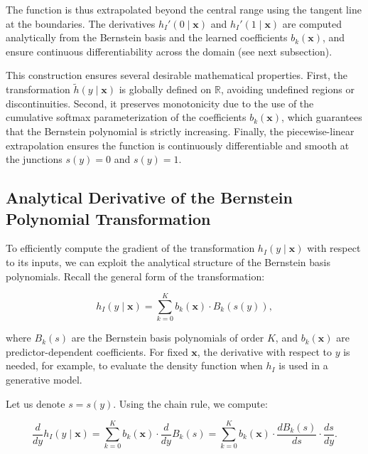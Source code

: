 The function is thus extrapolated beyond the central range using the tangent line at the boundaries. The derivatives \( h_I'(0 \mid \mathbf{x}) \) and \( h_I'(1 \mid \mathbf{x}) \) are computed analytically from the Bernstein basis and the learned coefficients \( b_k(\mathbf{x}) \), and ensure continuous differentiability across the domain (see next subsection).


This construction ensures several desirable mathematical properties. First, the transformation \( \tilde{h}(y \mid \mathbf{x}) \) is globally defined on \( \mathbb{R} \), avoiding undefined regions or discontinuities. Second, it preserves monotonicity due to the use of the cumulative softmax parameterization of the coefficients \( b_k(\mathbf{x}) \), which guarantees that the Bernstein polynomial is strictly increasing. Finally, the piecewise-linear extrapolation ensures the function is continuously differentiable and smooth at the junctions \( s(y) = 0 \) and \( s(y) = 1 \).




\subsection{Analytical Derivative of the Bernstein Polynomial Transformation}

To efficiently compute the gradient of the transformation \( h_I(y \mid \mathbf{x}) \) with respect to its inputs, we can exploit the analytical structure of the Bernstein basis polynomials. Recall the general form of the transformation:

\begin{equation}
h_I(y \mid \mathbf{x}) = \sum_{k=0}^{K} b_k(\mathbf{x}) \cdot B_k(s(y)),
\end{equation}

where \( B_k(s) \) are the Bernstein basis polynomials of order \( K \), and \( b_k(\mathbf{x}) \) are predictor-dependent coefficients. For fixed \( \mathbf{x} \), the derivative with respect to \( y \) is needed, for example, to evaluate the density function when \( h_I \) is used in a generative model.

Let us denote \( s = s(y) \). Using the chain rule, we compute:

\begin{equation}
\frac{d}{dy} h_I(y \mid \mathbf{x}) = \sum_{k=0}^{K} b_k(\mathbf{x}) \cdot \frac{d}{dy} B_k(s) = \sum_{k=0}^{K} b_k(\mathbf{x}) \cdot \frac{dB_k(s)}{ds} \cdot \frac{ds}{dy}.
\end{equation}

